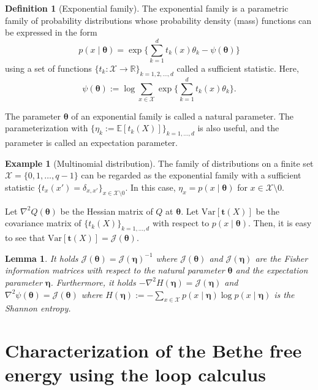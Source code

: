 \documentclass[a4paper,10pt,twoside,twocolumn,openany,final]{memoir}
\newcommand{\Var}{\mathrm{Var}}
\theoremstyle{plain}
\newtheorem{lemma}[theorem]{Lemma}
\theoremstyle{definition}
\newtheorem{definition}[theorem]{Definition}
\newtheorem{example}[theorem]{Example}
\theoremstyle{remark}
\begin{document}
\begin{definition}[Exponential family]
The exponential family is a parametric family of probability distributions
whose probability density (mass) functions can be expressed in the form
\begin{equation*}
p(x\mid \bm{\theta})=
\exp\bigg\{\sum_{k=1}^d t_k(x)\theta_k - \psi(\bm{\theta})\bigg\}
\end{equation*}
using a set of functions $\{t_k:\mathcal{X}\to\mathbb{R}\}_{k=1,2,\dotsc,d}$ called a sufficient statistic.
Here,
\begin{equation*}
\psi(\bm{\theta}) := \log \sum_{x\in\mathcal{X}}\exp\bigg\{\sum_{k=1}^d t_k(x)\theta_k \bigg\}.
\end{equation*}
\end{definition}
The parameter $\bm{\theta}$ of an exponential family is called a natural parameter.
The parameterization with $\{\eta_k:=\mathbb{E}[t_k(X)]\}_{k=1,\dotsc,d}$ is 
also useful, and the parameter is called an expectation parameter.

\begin{example}[Multinomial distribution]\label{exm:multi}
The family of distributions on a finite set $\mathcal{X}=\{0,1,\dotsc,q-1\}$ can be regarded as
the exponential family with a sufficient statistic $\{t_{x}(x')=\delta_{x,x'}\}_{x\in\mathcal{X}\setminus 0}$.
In this case, $\eta_x=p(x\mid \bm{\theta})$ for $x\in\mathcal{X}\setminus 0$.
\end{example}

Let $\nabla^2 Q(\bm{\theta})$ be the Hessian matrix of $Q$ at $\bm{\theta}$.
Let $\Var[\bm{t}(X)]$ be the covariance matrix of $\{t_k(X)\}_{k=1,\dotsc,d}$ 
with respect to $p(x\mid\bm{\theta})$.
Then, it is easy to see that $\Var[\bm{t}(X)]=\mathcal{J}(\bm{\theta})$.

\begin{lemma}\label{lem:fisher}
It holds
$\mathcal{J}(\bm{\theta}) = 
\mathcal{J}(\bm{\eta})^{-1}$
where $\mathcal{J}(\bm{\theta})$ and $\mathcal{J}(\bm{\eta})$ 
are the Fisher information matrices with respect to the natural parameter $\bm{\theta}$
and the expectation parameter $\bm{\eta}$.
Furthermore, it holds
$-\nabla^2 H(\bm{\eta}) = \mathcal{J}(\bm{\eta})$ and
$\nabla^2 \psi(\bm{\theta}) = \mathcal{J}(\bm{\theta})$
where $H(\bm{\eta}):=-\sum_{x\in\mathcal{X}} p(x\mid\bm{\eta})\log p(x\mid\bm{\eta})$
is the Shannon entropy.
\end{lemma}


\section{Characterization of the Bethe free energy using the loop calculus}
\end{document}
